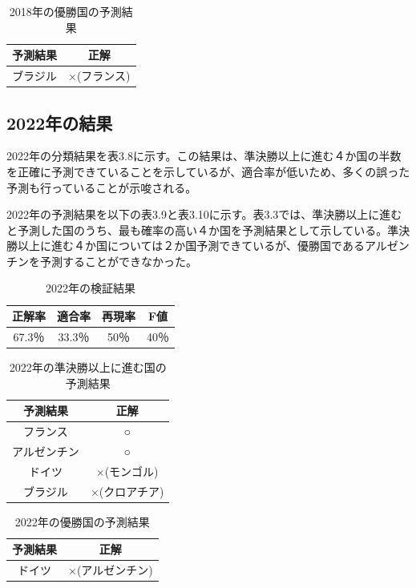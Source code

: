 \documentclass[platex]{suribt}
\begin{document}
\begin{table}[h]
  \centering
  \begin{tabular}{|c|c|}
    \hline
    予測結果 & 正解 \\ \hline
    ブラジル & ×(フランス) \\ \hline
  \end{tabular}
  \caption{2018年の優勝国の予測結果}
\end{table}

\subsection{2022年の結果}
2022年の分類結果を表3.8に示す。この結果は、準決勝以上に進む４か国の半数を正確に予測できていることを示しているが、適合率が低いため、多くの誤った予測も行っていることが示唆される。

2022年の予測結果を以下の表3.9と表3.10に示す。表3.3では、準決勝以上に進むと予測した国のうち、最も確率の高い４か国を予測結果として示している。準決勝以上に進む４か国については２か国予測できているが、優勝国であるアルゼンチンを予測することができなかった。

\begin{table}
  \centering
  \begin{tabular}{|c|c|c|c|}
    \hline
    正解率 & 適合率 & 再現率 & F値 \\ \hline
    67.3％ & 33.3％ & 50％ & 40％ \\ \hline
  \end{tabular}
  \caption{2022年の検証結果}
\end{table}

\begin{table}
  \centering
  \begin{tabular}{|c|c|}
    \hline
    予測結果 & 正解 \\ \hline
    フランス & ○ \\ \hline
    アルゼンチン & ○ \\ \hline
    ドイツ & ×(モンゴル) \\ \hline
    ブラジル & ×(クロアチア) \\ \hline
  \end{tabular}
  \caption{2022年の準決勝以上に進む国の予測結果}
\end{table}

\begin{table}
  \centering
  \begin{tabular}{|c|c|}
    \hline
    予測結果 & 正解 \\ \hline
    ドイツ & ×(アルゼンチン) \\ \hline
  \end{tabular}
  \caption{2022年の優勝国の予測結果}
\end{table}
\end{document}
